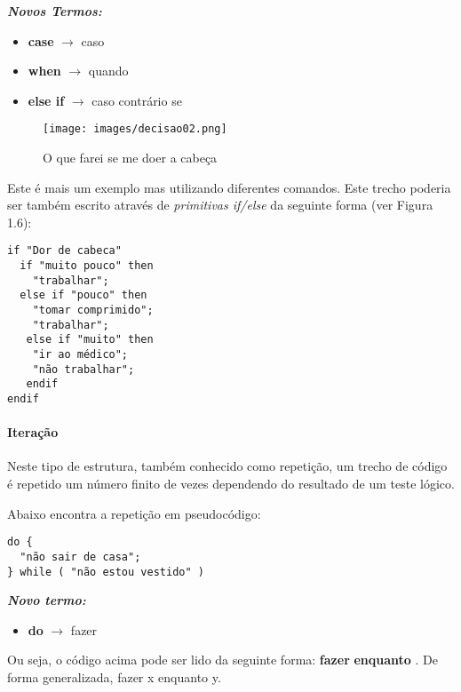 \textit{\textbf{Novos Termos:}}

\begin{itemize}
\item \textbf{case} \(\rightarrow\) caso
\item \textbf{when} \(\rightarrow\) quando
\item \textbf{else if} \(\rightarrow\) caso contrário se
\end{itemize}

\begin{figure}[!h]
\center\texttt{[image: images/decisao02.png]}
\caption{O que farei se me doer a cabeça}
\end{figure}

Este é mais um exemplo mas utilizando diferentes comandos. Este trecho poderia ser também escrito através de \textit{primitivas if/else} da seguinte forma (ver Figura 1.6):

\begin{lstlisting}
if "Dor de cabeca"          
  if "muito pouco" then          
    "trabalhar";          
  else if "pouco" then          
    "tomar comprimido";          
    "trabalhar";          
   else if "muito" then          
    "ir ao médico";          
    "não trabalhar";          
   endif          
endif      
\end{lstlisting}
 
\paragraph{Iteração}

Neste tipo de estrutura, também conhecido como repetição, um trecho de código é repetido um número finito de vezes dependendo do resultado de um teste lógico. 

Abaixo encontra a repetição  em pseudocódigo:

\begin{lstlisting}
do {        
  "não sair de casa";        
} while ( "não estou vestido" )     
\end{lstlisting}

\textit{\textbf{Novo termo:}}
\begin{itemize}
\item \textbf{do} \(\rightarrow\) fazer
\end{itemize}

Ou seja, o código acima pode ser lido da seguinte forma: \textbf{fazer}  \textbf{enquanto} . De forma generalizada, fazer x enquanto y.

